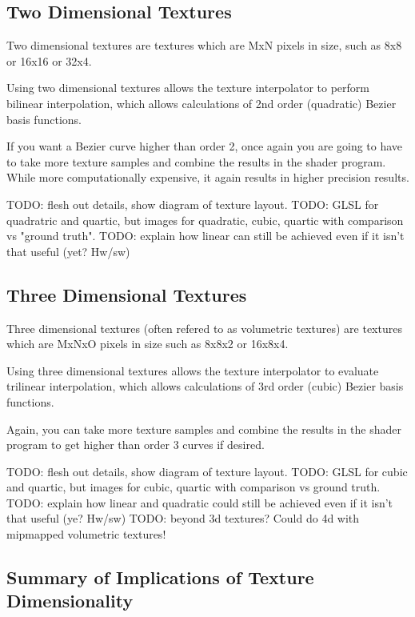 \documentclass{jcgt}
\begin{document}
\subsection{Two Dimensional Textures}

Two dimensional textures are textures which are MxN pixels in size, such as 8x8 or 16x16 or 32x4.

Using two dimensional textures allows the texture interpolator to perform bilinear interpolation, which allows calculations of 2nd order (quadratic) Bezier basis functions.

If you want a Bezier curve higher than order 2, once again you are going to have to take more texture samples and combine the results in the shader program.  While more computationally expensive, it again results in higher precision results.

TODO: flesh out details, show diagram of texture layout.
TODO: GLSL for quadratric and quartic, but images for quadratic, cubic, quartic with comparison vs "ground truth".
TODO: explain how linear can still be achieved even if it isn't that useful (yet? Hw/sw)

\subsection{Three Dimensional Textures}

Three dimensional textures (often refered to as volumetric textures) are textures which are MxNxO pixels in size such as 8x8x2 or 16x8x4.

Using three dimensional textures allows the texture interpolator to evaluate trilinear interpolation, which allows calculations of 3rd order (cubic) Bezier basis functions.

Again, you can take more texture samples and combine the results in the shader program to get higher than order 3 curves if desired.

TODO: flesh out details, show diagram of texture layout.
TODO: GLSL for cubic and quartic, but images for cubic, quartic with comparison vs ground truth.
TODO: explain how linear and quadratic could still be achieved even if it isn't that useful (ye? Hw/sw)
TODO: beyond 3d textures? Could do 4d with mipmapped volumetric textures!

\subsection{Summary of Implications of Texture Dimensionality}
\end{document}
